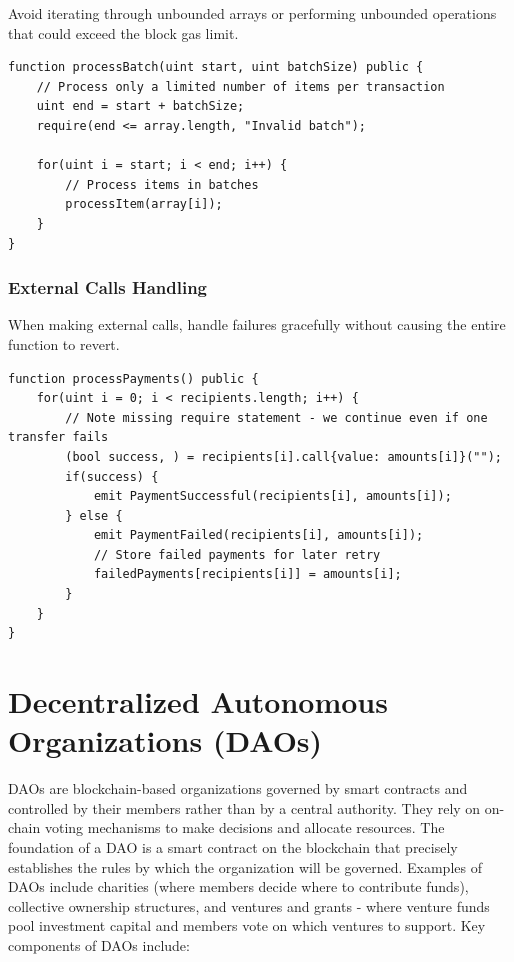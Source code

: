 \documentclass[12pt]{article}
\begin{document}
Avoid iterating through unbounded arrays or performing unbounded operations that
could exceed the block gas limit.

\noindent
\begin{minipage}{\textwidth}
    \begin{lstlisting}[language=Solidity, caption=Bounded Operations Example]
function processBatch(uint start, uint batchSize) public {
    // Process only a limited number of items per transaction
    uint end = start + batchSize;
    require(end <= array.length, "Invalid batch");
    
    for(uint i = start; i < end; i++) {
        // Process items in batches
        processItem(array[i]);
    }
}
\end{lstlisting}
\end{minipage}

\subsubsection*{External Calls Handling}

When making external calls, handle failures gracefully without causing the
entire function to revert.

\noindent
\begin{minipage}{\textwidth}
    \begin{lstlisting}[language=Solidity, caption=Safe External Call Example]
function processPayments() public {
    for(uint i = 0; i < recipients.length; i++) {
        // Note missing require statement - we continue even if one transfer fails
        (bool success, ) = recipients[i].call{value: amounts[i]}("");
        if(success) {
            emit PaymentSuccessful(recipients[i], amounts[i]);
        } else {
            emit PaymentFailed(recipients[i], amounts[i]);
            // Store failed payments for later retry
            failedPayments[recipients[i]] = amounts[i];
        }
    }
}
\end{lstlisting}
\end{minipage}

\section{Decentralized Autonomous Organizations (DAOs)}

DAOs are blockchain-based organizations governed by smart contracts and
controlled by their members rather than by a central authority. They rely on
on-chain voting mechanisms to make decisions and allocate resources. The
foundation of a DAO is a smart contract on the blockchain that precisely
establishes the rules by which the organization will be governed. Examples of
DAOs include charities (where members decide where to contribute funds),
collective ownership structures, and ventures and grants - where venture funds
pool investment capital and members vote on which ventures to support. Key
components of DAOs include:
\end{document}
